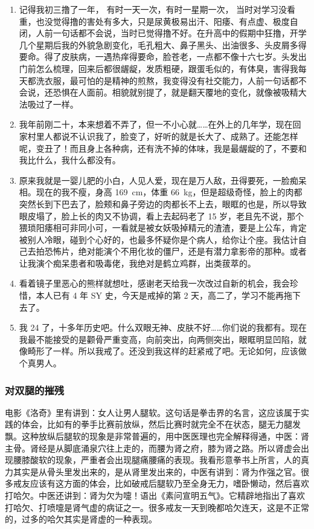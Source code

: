\documentclass[fontset=founder]{ctexart}
\begin{document}
\begin{enumerate}
    \item 记得我初三撸了一年， 有时一天一次，有时一星期一次， 当时对学习没看重，也没觉得撸的害处有多大，只是尿黄极易出汗、阳痿、有点虚、极度自闭，人前一句话都不会说，当时已觉得撸不好。在升高中的假期中狂撸，开学几个星期后我的外貌急剧变化，毛孔粗大、鼻子黑头、出油很多、头皮屑多得要命。得了皮肤病，一遇热痒得要命，脸苍老，一点都不像十六七岁。头发出门前怎么梳理，回来后都很龌龊，发质粗硬，跟蛋毛似的，有体臭，害得我每天都洗衣服，最可怕的是精神的煎熬，我变得没有社交能力，人前一句话都不会说，还恐惧在人面前。相貌就别提了，就是翻天覆地的变化，就像被吸精大法吸过了一样。
    \item 我年前刚二十，本来想着不弄了，但一不小心就……在外上的几年学，现在回家村里人都说不认识我了，脸变了，好听的就是长大了、成熟了。还能怎样呢，变丑了！而且身上各种病，还有洗不掉的体味，我是最龌龊的了，不要和我比什么，我什么都没有。
    \item 原来我就是一婴儿肥的小白，人见人爱，现在是万人敌，丑得要死，一脸痴呆相。现在的我不瘦，身高 \SI{169}{\centi\metre}，体重 \SI{66}{\kilo\gram}，但是超级奇怪，脸上的肉都突然长到下巴去了，脸颊和鼻子旁边的肉都长不上去，眼眶的也是，所以导致眼皮塌了，脸上长的肉又不协调，看上去起码老了 15 岁，老且先不说，那个猥琐阳痿相可非同小可，一看就是被女妖吸掉精元的渣渣，要是上公车，肯定被别人冷眼，碰到个心好的，也最多怀疑你是个病人，给你让个座。我估计自己去拍恐怖片，绝对能演个不用化妆的僵尸，还是有潜力拿影帝的那种。或者让我演个痴呆患者和吸毒佬，我绝对是鹤立鸡群，出类菝萃的。
    \item 看着镜子里恶心的熊样就想吐，感谢老天给我一次改过自新的机会，我会珍惜，本人已有 4 年 SY 史，今天是戒掉的第 2 天，高二了，学习不能再拖下去了。
    \item 我 24 了，十多年历史吧。什么双眼无神、皮肤不好……你们说的我都有。现在我最不能接受的是颧骨严重变高，向前突出，向两侧突出，眼眶明显凹陷，就像畸形了一样。所以我戒了。还没到我这样的赶紧戒了吧。无论如何，应该做个真男人。
\end{enumerate}

\subsubsection{对双腿的摧残}

电影《洛奇》里有讲到：女人让男人腿软。这句话是拳击界的名言，这应该属于实践的体会，比如有的拳手比赛前放纵，然后比赛时就完全不在状态，腿无力腿发飘。这种放纵后腿软的现象是非常普遍的，用中医医理也完全解释得通，中医：肾主骨。肾经是从脚底涌泉穴往上走的，而腰为肾之府，膝为肾之路。所以肾虚会出现腰膝酸软的现象，严重者会出现腿痛腰痛的表现。我看形意拳书上所言，人的真力其实是从骨头里发出来的，是从肾里发出来的，中医有讲到：肾为作强之官。很多戒友应该有这方面的体会，比如破戒后腿软乃至全身无力，嗜卧懒动，然后喜欢打哈欠。中医还讲到：肾为欠为嚏！语出《素问宣明五气》。它精辟地指出了喜欢打哈欠、打喷嚏是肾气虚的病证之一。很多戒友一天到晚都哈欠连天，这是不正常的，过多的哈欠其实是肾虚的一种表现。
\end{document}
